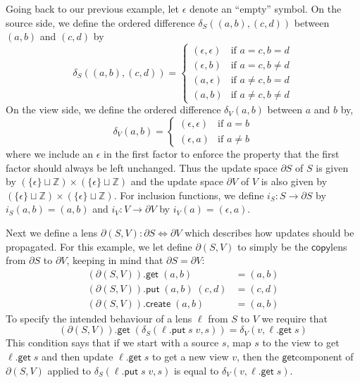 \documentclass[acmsmall,review,anonymous]{acmart}\settopmatter{printfolios=true,printccs=false,printacmref=false}
\newcommand{\kw}[1]{\ensuremath{\mathsf{#1}}}
\newcommand{\get}{\ensuremath{\kw{get}}}
\newcommand{\pput}{\ensuremath{\kw{put}}}
\newcommand{\create}{\ensuremath{\kw{create}}}
\newcommand{\ccopy}{\ensuremath{\kw{copy}}}
\begin{document}
Going back to our previous example, let $\epsilon$ denote an ``empty''
symbol. On the source side, we define the ordered difference $\delta_S((a, b),
(c, d))$ between $(a, b)$ and $(c, d)$ by
$$\delta_S((a, b), (c,
d)) = \begin{cases}
(\epsilon, \epsilon) & \text{if }a = c, b = d\\
(\epsilon, b) & \text{if }a=c, b \neq d\\
(a, \epsilon) & \text{if }a \neq c, b = d\\
(a, b) & \text{if }a \neq c, b \neq d
\end{cases}$$
On the view side, we define the ordered difference $\delta_V(a, b)$
between $a$ and $b$ by, $$\delta_V(a, b) = \begin{cases}
(\epsilon, \epsilon) & \text{if } a = b\\
(\epsilon, a) & \text{if } a \neq b
\end{cases}$$
where we include an $\epsilon$ in the first factor to enforce the property that
the first factor should always be left unchanged. Thus the update space
$\partial S$ of $S$ is given by $(\{\epsilon\} \sqcup \mathbb{Z})
\times(\{\epsilon\} \sqcup \mathbb{Z})$ and the update space $\partial V$ of
$V$ is also given by $(\{\epsilon\} \sqcup \mathbb{Z}) \times(\{\epsilon\}
\sqcup \mathbb{Z})$. For inclusion functions, we define $i_S : S \longrightarrow
\partial S$ by $i_S(a, b) = (a, b)$ and $i_V : V \longrightarrow \partial V$ by
$i_V(a) = (\epsilon, a)$.

Next we define a lens $\partial(S, V) : \partial S \Leftrightarrow \partial V$
which describes how updates should be propagated. For this example, we let
define $\partial(S,V)$ to simply be the \ccopy lens from $\partial S$ to
$\partial V$, keeping in mind that $\partial S = \partial V$:
\begin{align*}
(\partial(S, V)).\get \; (a, b) &= (a, b)\\
(\partial(S, V)).\pput \; (a, b) \; (c, d) &= (c, d)\\
(\partial(S, V)).\create \; (a, b) &= (a, b)
\end{align*}
To specify the intended behaviour of a lens $\ell$ from $S$ to $V$ we
require that
\begin{equation}\label{partialpreservesdelta}
(\partial (S, V)).\get \; (\delta_S(\ell.\pput \; s \; v, s)) = \delta_V(v,
\ell.\get \; s)
\end{equation}
This condition says that if we start with a source $s$, map $s$ to the view
to get $\ell.\get \; s$ and then update $\ell.\get \; s$ to get a new view $v$,
then the \get component of $\partial(S, V)$ applied to $\delta_S(\ell.\pput \; s
\; v, s)$ is equal to $\delta_V(v, \ell.\get \; s)$.
\end{document}
